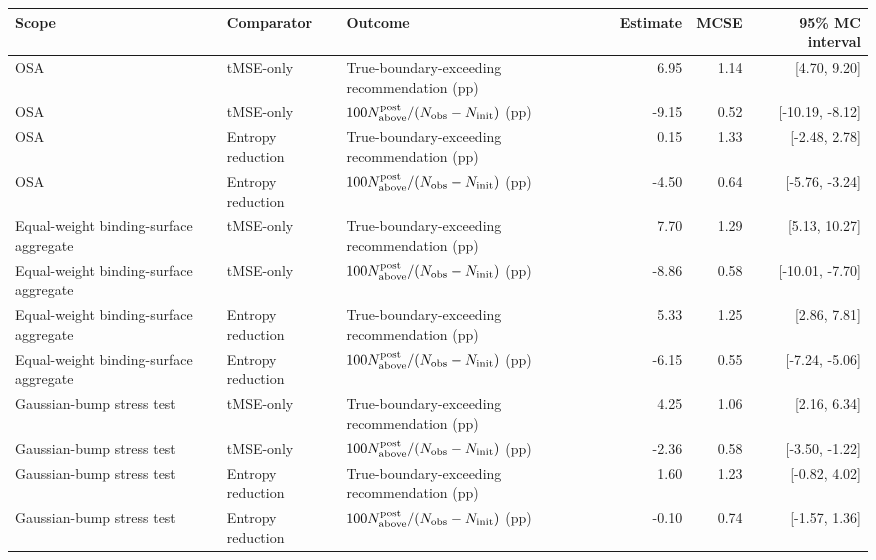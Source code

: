 \begin{tabular}{lllrrr}
\toprule
Scope & Comparator & Outcome & Estimate & MCSE & 95\% MC interval \\
\midrule
OSA & tMSE-only & True-boundary-exceeding recommendation (pp) & 6.95 & 1.14 & [4.70, 9.20] \\
OSA & tMSE-only & $100N_{\rm above}^{\rm post}/(N_{\rm obs}-N_{\rm init})$ (pp) & -9.15 & 0.52 & [-10.19, -8.12] \\
OSA & Entropy reduction & True-boundary-exceeding recommendation (pp) & 0.15 & 1.33 & [-2.48, 2.78] \\
OSA & Entropy reduction & $100N_{\rm above}^{\rm post}/(N_{\rm obs}-N_{\rm init})$ (pp) & -4.50 & 0.64 & [-5.76, -3.24] \\
Equal-weight binding-surface aggregate & tMSE-only & True-boundary-exceeding recommendation (pp) & 7.70 & 1.29 & [5.13, 10.27] \\
Equal-weight binding-surface aggregate & tMSE-only & $100N_{\rm above}^{\rm post}/(N_{\rm obs}-N_{\rm init})$ (pp) & -8.86 & 0.58 & [-10.01, -7.70] \\
Equal-weight binding-surface aggregate & Entropy reduction & True-boundary-exceeding recommendation (pp) & 5.33 & 1.25 & [2.86, 7.81] \\
Equal-weight binding-surface aggregate & Entropy reduction & $100N_{\rm above}^{\rm post}/(N_{\rm obs}-N_{\rm init})$ (pp) & -6.15 & 0.55 & [-7.24, -5.06] \\
Gaussian-bump stress test & tMSE-only & True-boundary-exceeding recommendation (pp) & 4.25 & 1.06 & [2.16, 6.34] \\
Gaussian-bump stress test & tMSE-only & $100N_{\rm above}^{\rm post}/(N_{\rm obs}-N_{\rm init})$ (pp) & -2.36 & 0.58 & [-3.50, -1.22] \\
Gaussian-bump stress test & Entropy reduction & True-boundary-exceeding recommendation (pp) & 1.60 & 1.23 & [-0.82, 4.02] \\
Gaussian-bump stress test & Entropy reduction & $100N_{\rm above}^{\rm post}/(N_{\rm obs}-N_{\rm init})$ (pp) & -0.10 & 0.74 & [-1.57, 1.36] \\
\bottomrule
\end{tabular}
